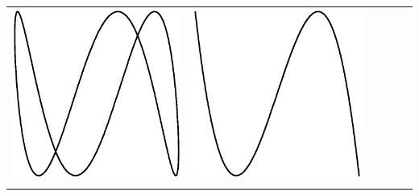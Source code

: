 \begin{center}
\begin{tabular}{c|ccccc}
\includegraphics[scale=0.2]{05_Oscilloscope/3-4.eps} &
\includegraphics[scale=0.2]{05_Oscilloscope/3-5.eps} \\
&&&&&\\

\end{tabular}
\end{center}
